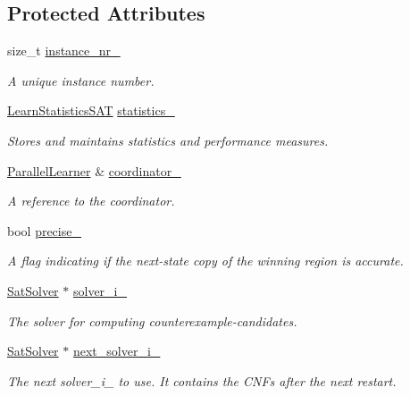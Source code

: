 \subsection*{Protected Attributes}
\begin{DoxyCompactItemize}
\item 
size\-\_\-t \hyperlink{classClauseExplorerSAT_ab9ff4163b38a8ce70e07b78ea2e76cc2}{instance\-\_\-nr\-\_\-}
\begin{DoxyCompactList}\small\item\em A unique instance number. \end{DoxyCompactList}\item 
\hyperlink{classLearnStatisticsSAT}{Learn\-Statistics\-S\-A\-T} \hyperlink{classClauseExplorerSAT_a1d37eb0233177911835bc073fbe1c224}{statistics\-\_\-}
\begin{DoxyCompactList}\small\item\em Stores and maintains statistics and performance measures. \end{DoxyCompactList}\item 
\hyperlink{classParallelLearner}{Parallel\-Learner} \& \hyperlink{classClauseExplorerSAT_a8909bb332c60d7611763ca5976fbe6f6}{coordinator\-\_\-}
\begin{DoxyCompactList}\small\item\em A reference to the coordinator. \end{DoxyCompactList}\item 
bool \hyperlink{classClauseExplorerSAT_a3edc259c6f39cce098ab18a2dce7f262}{precise\-\_\-}
\begin{DoxyCompactList}\small\item\em A flag indicating if the next-\/state copy of the winning region is accurate. \end{DoxyCompactList}\item 
\hyperlink{classSatSolver}{Sat\-Solver} $\ast$ \hyperlink{classClauseExplorerSAT_a65b5b3d04ff5be8bfec60d3dcf86e4d0}{solver\-\_\-i\-\_\-}
\begin{DoxyCompactList}\small\item\em The solver for computing counterexample-\/candidates. \end{DoxyCompactList}\item 
\hyperlink{classSatSolver}{Sat\-Solver} $\ast$ \hyperlink{classClauseExplorerSAT_abbaa9b938df08f811dd361216527176c}{next\-\_\-solver\-\_\-i\-\_\-}
\begin{DoxyCompactList}\small\item\em The next solver\-\_\-i\-\_\- to use. It contains the C\-N\-Fs after the next restart. \end{DoxyCompactList}\item 

\end{DoxyCompactItemize}
